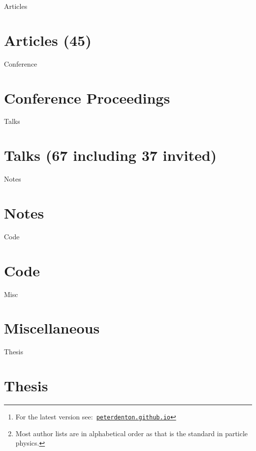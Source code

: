 \documentclass[12pt]{article}
\title{\myTitle}
\author{\myName}
\date{\small Updated: \today\footnote{For the latest version see:\ \href{http://peterdenton.github.io}{\tt peterdenton.github.io}} \footnote{Most author lists are in alphabetical order as that is the standard in particle physics.}}
\newcommand\myBib[2]{
\begin{btSect}{#2}
\section*{#1}
\btPrintAll
\end{btSect}}
\begin{document}

\maketitle



\myBib{Articles (45)}{Articles}
\myBib{Conference Proceedings}{Conference}
\myBib{Talks (67 including 37 invited)}{Talks}
\myBib{Notes}{Notes}
\myBib{Code}{Code}
\myBib{Miscellaneous}{Misc}
\myBib{Thesis}{Thesis}
\end{document}
